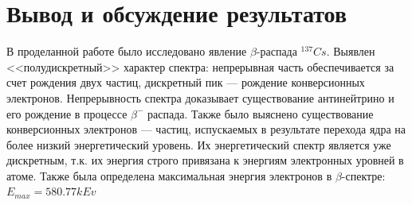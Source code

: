 \documentclass[a4paper,12pt]{article}
\begin{document}
\newpage

\section{Вывод и обсуждение результатов}
		В проделанной работе было исследовано явление $\beta$-распада $^{137}Cs$. Выявлен <<полудискретный>> характер спектра: непрерывная часть обеспечивается за счет рождения двух частиц, дискретный пик --- рождение конверсионных электронов.
		Непрерывность спектра доказывает существование антинейтрино и его рождение в процессе $\beta^-$ распада. Также было выяснено существование конверсионных электронов --- частиц, испускаемых в результате перехода ядра на более низкий энергетический уровень. Их энергетический спектр является уже дискретным, т.к. их энергия строго привязана к энергиям электронных уровней в атоме.
		Также была определена максимальная энергия электронов в $\beta$-спектре:
		$E_{max} = 580.77 kEv$
\end{document}
